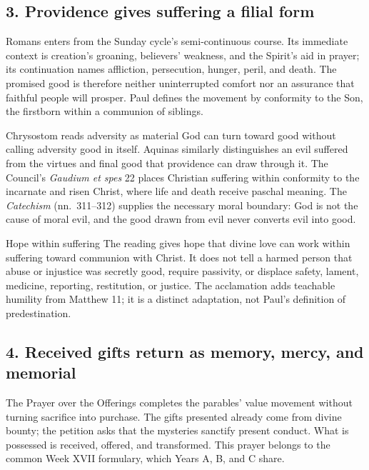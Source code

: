 {\newpage

\subsection*{3. Providence gives suffering a filial form\enspace{}}

Romans enters from the Sunday cycle's semi-continuous course. Its immediate context is creation's groaning, believers' weakness, and the Spirit's aid in prayer; its continuation names affliction, persecution, hunger, peril, and death. The promised good is therefore neither uninterrupted comfort nor an assurance that faithful people will prosper. Paul defines the movement by conformity to the Son, the firstborn within a communion of siblings.

Chrysostom reads adversity as material God can turn toward good without calling adversity good in itself. Aquinas similarly distinguishes an evil suffered from the virtues and final good that providence can draw through it. The Council's \emph{Gaudium et spes} 22 places Christian suffering within conformity to the incarnate and risen Christ, where life and death receive paschal meaning. The \emph{Catechism} (nn.~311--312) supplies the necessary moral boundary: God is not the cause of moral evil, and the good drawn from evil never converts evil into good.

\begin{studybox}{Hope within suffering}
The reading gives hope that divine love can work within suffering toward communion with Christ. It does not tell a harmed person that abuse or injustice was secretly good, require passivity, or displace safety, lament, medicine, reporting, restitution, or justice. The acclamation adds teachable humility from Matthew 11; it is a distinct adaptation, not Paul's definition of predestination.
\end{studybox}

\subsection*{4. Received gifts return as memory, mercy, and memorial\enspace{}}

The Prayer over the Offerings completes the parables' value movement without turning sacrifice into purchase. The gifts presented already come from divine bounty; the petition asks that the mysteries sanctify present conduct. What is possessed is received, offered, and transformed. This prayer belongs to the common Week XVII formulary, which Years A, B, and C share.

}
